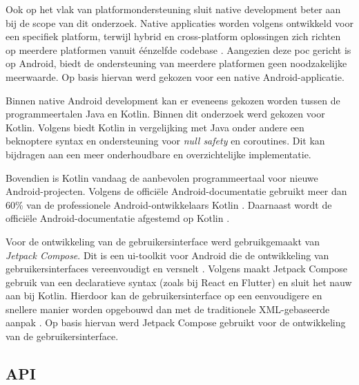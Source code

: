 \vspace{1em}

Ook op het vlak van platformondersteuning sluit native development beter aan bij de scope van dit onderzoek. Native applicaties worden volgens \textcite{Zarichuk2023} ontwikkeld voor een specifiek platform, terwijl hybrid en cross-platform oplossingen zich richten op meerdere platformen vanuit éénzelfde codebase \autocite{Zarichuk2023}. Aangezien deze \acrshort{poc} gericht is op Android, biedt de ondersteuning van meerdere platformen geen noodzakelijke meerwaarde. Op basis hiervan werd gekozen voor een native Android-applicatie.

\vspace{1em}

Binnen native Android development kan er eveneens gekozen worden tussen de programmeertalen Java en Kotlin. Binnen dit onderzoek werd gekozen voor Kotlin. Volgens \textcite{Bekmuratov2025} biedt Kotlin in vergelijking met Java onder andere een beknoptere syntax en ondersteuning voor \textit{null safety} en coroutines. Dit kan bijdragen aan een meer onderhoudbare en overzichtelijke implementatie.

\vspace{1em}

Bovendien is Kotlin vandaag de aanbevolen programmeertaal voor nieuwe Android-projecten. Volgens de officiële Android-documentatie gebruikt meer dan 60\% van de professionele Android-ontwikkelaars Kotlin \autocite{AndroidDevelopersKotlin}. Daarnaast wordt de officiële Android-documentatie afgestemd op Kotlin \autocite{AndroidDevelopersKotlin}.

\vspace{1em}

Voor de ontwikkeling van de gebruikersinterface werd gebruikgemaakt van \textit{Jetpack Compose}. Dit is een \acrshort{ui}-toolkit voor Android die de ontwikkeling van gebruikersinterfaces vereenvoudigt en versnelt \autocite{AndroidDevelopersCompose}. Volgens \textcite{Bekmuratov2025} maakt Jetpack Compose gebruik van een declaratieve syntax (zoals bij React en Flutter) en sluit het nauw aan bij Kotlin. Hierdoor kan de gebruikersinterface op een eenvoudigere en snellere manier worden opgebouwd dan met de traditionele XML-gebaseerde aanpak \autocite{Bekmuratov2025}. Op basis hiervan werd Jetpack Compose gebruikt voor de ontwikkeling van de gebruikersinterface.

\vspace{1em}

\subsection{API}
\label{subsec:api}

